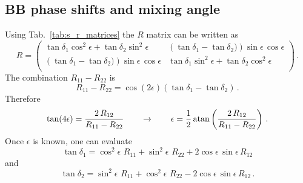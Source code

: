 \documentclass[10pt,a4paper]{article}
\begin{document}
	\subsection{BB phase shifts and mixing angle}
	Using Tab.~\ref{tab:s_r_matrices} the $R$ matrix can be written as
	\begin{equation}
		R= \left(
		\begin{array}{cc}
			\tan \delta_1 \cos ^2 \epsilon +\tan \delta_2 \sin ^2 \epsilon  & 
			\left(\tan\delta_1 -\tan\delta_2)\right) \sin\epsilon\, \cos  \epsilon \\
			\left(\tan\delta_1 -\tan\delta_2)\right) \sin\epsilon\, \cos  \epsilon & 
			\tan \delta_1 \sin ^2
			\epsilon +\tan \delta_2 \cos ^2\epsilon \\
		\end{array}
		\right)\,.
		\label{eq:RBB}
	\end{equation}
	The combination $R_{11}-R_{22}$ is
	\begin{equation}
		R_{11}-R_{22} = 
		\cos(2\epsilon) 
		\left(\tan \delta_1 - \tan \delta_2\right)\,.
	\end{equation}
	Therefore
	\begin{equation}
		\tan(4\epsilon) = \frac{2\,R_{12}}{R_{11}-R_{22}}
		\qquad
		\rightarrow
		\qquad
		\epsilon =
		\frac{1}{2} \atan\left(\frac{2\,R_{12}}{R_{11}-R_{22}}\right)\,.
	\end{equation}
	Once $\epsilon$ is known, one can evaluate 
	\begin{equation}
		\tan\delta_1
		=
		\cos^2 \epsilon \,\,R_{11}
		+\sin^2 \epsilon \,\,R_{22}
		+2 \cos\epsilon \,\sin\epsilon\, R_{12}
	\end{equation}
	and
	\begin{equation}
		\tan\delta_2
		=
		\sin^2 \epsilon\,\,R_{11}
		+\cos^2 \epsilon \,\,R_{22}
		-2 \cos\epsilon\, \sin\epsilon\, R_{12}\,.
	\end{equation}
	
\end{document}
